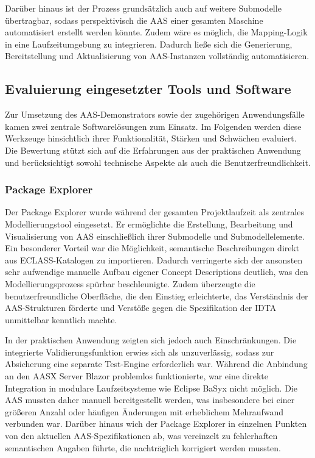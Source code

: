 Darüber hinaus ist der Prozess grundsätzlich auch auf weitere Submodelle übertragbar, sodass perspektivisch die AAS einer gesamten Maschine automatisiert erstellt werden könnte. 
Zudem wäre es möglich, die Mapping-Logik in eine Laufzeitumgebung zu integrieren. 
Dadurch ließe sich die Generierung, Bereitstellung und Aktualisierung von AAS-Instanzen vollständig automatisieren.

\subsection{Evaluierung eingesetzter Tools und Software}
Zur Umsetzung des AAS-Demonstrators sowie der zugehörigen Anwendungsfälle kamen zwei zentrale Softwarelösungen zum Einsatz.
Im Folgenden werden diese Werkzeuge hinsichtlich ihrer Funktionalität, Stärken und Schwächen evaluiert.
Die Bewertung stützt sich auf die Erfahrungen aus der praktischen Anwendung und berücksichtigt sowohl technische Aspekte als auch die Benutzerfreundlichkeit.

\newpage
\subsubsection{Package Explorer}

Der Package Explorer wurde während der gesamten Projektlaufzeit als zentrales Modellierungstool eingesetzt.
Er ermöglichte die Erstellung, Bearbeitung und Visualisierung von AAS einschließlich ihrer Submodelle und Submodellelemente.
Ein besonderer Vorteil war die Möglichkeit, semantische Beschreibungen direkt aus ECLASS-Katalogen zu importieren.
Dadurch verringerte sich der ansonsten sehr aufwendige manuelle Aufbau eigener Concept Descriptions deutlich, was den Modellierungsprozess spürbar beschleunigte.
Zudem überzeugte die benutzerfreundliche Oberfläche, die den Einstieg erleichterte, das Verständnis der AAS-Strukturen förderte und Verstöße gegen die Spezifikation der IDTA unmittelbar kenntlich machte.

In der praktischen Anwendung zeigten sich jedoch auch Einschränkungen.
Die integrierte Validierungsfunktion erwies sich als unzuverlässig, sodass zur Absicherung eine separate Test-Engine erforderlich war.
Während die Anbindung an den AASX Server Blazor problemlos funktionierte, war eine direkte Integration in modulare Laufzeitsysteme wie Eclipse BaSyx nicht möglich.
Die AAS mussten daher manuell bereitgestellt werden, was insbesondere bei einer größeren Anzahl oder häufigen Änderungen mit erheblichem Mehraufwand verbunden war.
Darüber hinaus wich der Package Explorer in einzelnen Punkten von den aktuellen AAS-Spezifikationen ab, was vereinzelt zu fehlerhaften semantischen Angaben führte, die nachträglich korrigiert werden mussten.

